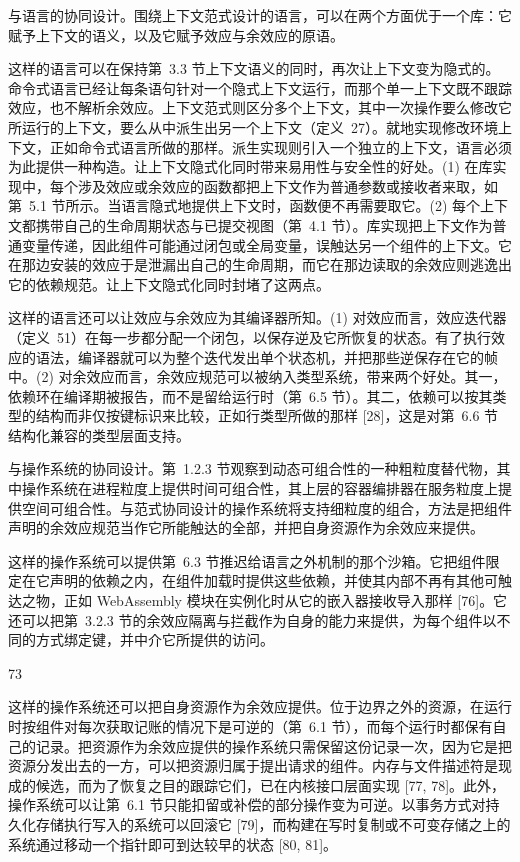 与语言的协同设计。围绕上下文范式设计的语言，可以在两个方面优于一个库：它赋予上下文的语义，以及它赋予效应与余效应的原语。

这样的语言可以在保持第~3.3 节上下文语义的同时，再次让上下文变为隐式的。命令式语言已经让每条语句针对一个隐式上下文运行，而那个单一上下文既不跟踪效应，也不解析余效应。上下文范式则区分多个上下文，其中一次操作要么修改它所运行的上下文，要么从中派生出另一个上下文（定义~27）。就地实现修改环境上下文，正如命令式语言所做的那样。派生实现则引入一个独立的上下文，语言必须为此提供一种构造。让上下文隐式化同时带来易用性与安全性的好处。(1) 在库实现中，每个涉及效应或余效应的函数都把上下文作为普通参数或接收者来取，如第~5.1 节所示。当语言隐式地提供上下文时，函数便不再需要取它。(2) 每个上下文都携带自己的生命周期状态与已提交视图（第~4.1 节）。库实现把上下文作为普通变量传递，因此组件可能通过闭包或全局变量，误触达另一个组件的上下文。它在那边安装的效应于是泄漏出自己的生命周期，而它在那边读取的余效应则逃逸出它的依赖规范。让上下文隐式化同时封堵了这两点。

这样的语言还可以让效应与余效应为其编译器所知。(1) 对效应而言，效应迭代器（定义~51）在每一步都分配一个闭包，以保存逆及它所恢复的状态。有了执行效应的语法，编译器就可以为整个迭代发出单个状态机，并把那些逆保存在它的帧中。(2) 对余效应而言，余效应规范可以被纳入类型系统，带来两个好处。其一，依赖环在编译期被报告，而不是留给运行时（第~6.5 节）。其二，依赖可以按其类型的结构而非仅按键标识来比较，正如行类型所做的那样 {[}28{]}，这是对第~6.6 节结构化兼容的类型层面支持。

与操作系统的协同设计。第~1.2.3 节观察到动态可组合性的一种粗粒度替代物，其中操作系统在进程粒度上提供时间可组合性，其上层的容器编排器在服务粒度上提供空间可组合性。与范式协同设计的操作系统将支持细粒度的组合，方法是把组件声明的余效应规范当作它所能触达的全部，并把自身资源作为余效应来提供。

这样的操作系统可以提供第~6.3 节推迟给语言之外机制的那个沙箱。它把组件限定在它声明的依赖之内，在组件加载时提供这些依赖，并使其内部不再有其他可触达之物，正如 WebAssembly 模块在实例化时从它的嵌入器接收导入那样 {[}76{]}。它还可以把第~3.2.3 节的余效应隔离与拦截作为自身的能力来提供，为每个组件以不同的方式绑定键，并中介它所提供的访问。

73

这样的操作系统还可以把自身资源作为余效应提供。位于边界之外的资源，在运行时按组件对每次获取记账的情况下是可逆的（第~6.1 节），而每个运行时都保有自己的记录。把资源作为余效应提供的操作系统只需保留这份记录一次，因为它是把资源分发出去的一方，可以把资源归属于提出请求的组件。内存与文件描述符是现成的候选，而为了恢复之目的跟踪它们，已在内核接口层面实现 {[}77, 78{]}。此外，操作系统可以让第~6.1 节只能扣留或补偿的部分操作变为可逆。以事务方式对持久化存储执行写入的系统可以回滚它 {[}79{]}，而构建在写时复制或不可变存储之上的系统通过移动一个指针即可到达较早的状态 {[}80, 81{]}。
